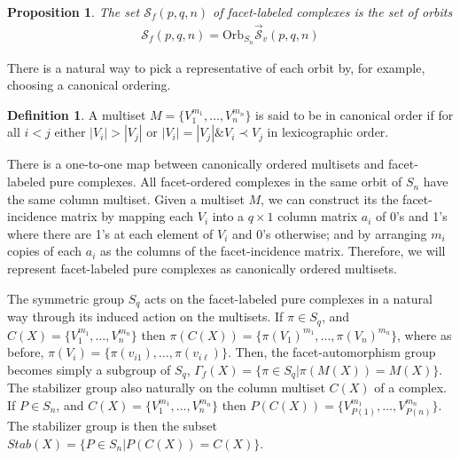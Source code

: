 \documentclass[12pt]{article}
\theoremstyle{plain}
\newtheorem{prop}[thm]{Proposition}
\theoremstyle{definition}
\newtheorem{defn}{Definition}[section]
\theoremstyle{remark}
\newcommand{\CR}{\nonumber\\}
\begin{document}
\begin{prop}
    The set $\mathcal{S}_f(p,q,n)$ of facet-labeled complexes is the set of orbits
\begin{align}
    \mathcal{S}_f(p,q,n)=\mathrm{Orb}_{S_n}\vec{\mathcal{S}}_v(p,q,n)
\end{align}
\end{prop}
There is a natural way to pick a representative of each orbit by, for example, choosing a canonical ordering. 
\begin{defn}
    A multiset $M=\{V_1^{m_1},\dots,V_n^{m_n}\}$ is said to be in canonical order if for all $i<j$ either $|V_i|>|V_j|$ or $|V_i|=|V_j| \& V_i \prec V_j$ in lexicographic order.
\end{defn}
There is a one-to-one map between canonically ordered multisets and facet-labeled pure complexes. All facet-ordered complexes in the same orbit of $S_n$ have the same column multiset. Given a multiset $M$, we can construct its the facet-incidence matrix by mapping each $V_i$ into a $q\times 1$ column matrix $a_i$ of 0's and 1's where there are 1's at each element of $V_i$ and 0's otherwise; and by arranging $m_i$ copies of each $a_i$ as the columns of the facet-incidence matrix. Therefore, we will represent facet-labeled pure complexes as canonically ordered multisets. 

The symmetric group $S_q$ acts on the facet-labeled pure complexes in a natural way through its induced action on the multisets. If $\pi\in S_q$, and $C(X)=\{V_1^{m_1},\dots,V_n^{m_n}\}$ then $\pi\left(C(X)\right) = \{\pi(V_1)^{m_1},\dots,\pi(V_n)^{m_n}\}$, where as before, $\pi(V_i) = \{\pi(v_{i1}),\dots,\pi(v_{i\ell})\}$. Then, the facet-automorphism group becomes simply a subgroup of $S_q$, $\Gamma_f(X) = \{\pi\in S_q | \pi(M(X)) = M(X)\}$. The stabilizer group also naturally on the column multiset $C(X)$ of a complex. If $P\in S_n$, and $C(X)=\{V_1^{m_1},\dots,V_n^{m_n}\}$ then $P\left(C(X)\right) = \{V_{P(1)}^{m_1},\dots,V_{P(n)}^{m_n}\}$. The stabilizer group is then the subset $Stab(X) = \{P\in S_n|P(C(X))=C(X)\}$.
\end{document}
